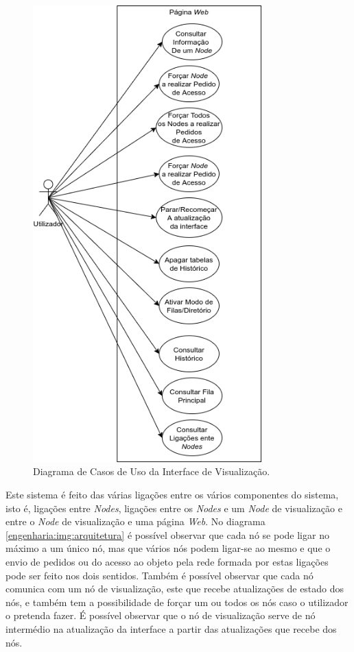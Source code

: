 \begin{figure}[h!]
\centering
\includegraphics[width=250pt]{use_case_diagram.png}
\caption{Diagrama de Casos de Uso da Interface de Visualização.}
\label{engenharia:img:casos_de_uso}
\end{figure}


Este sistema é feito das várias ligações entre os vários componentes do sistema, isto é,
ligações entre \emph{Nodes}, ligações entre os \emph{Nodes} e um \emph{Node} de visualização 
e entre o \emph{Node} de visualização e uma página \emph{Web}. No diagrama \ref{engenharia:img:arquitetura} é possível
observar que cada nó se pode ligar no máximo a um único nó, mas que vários nós podem ligar-se ao mesmo e que o envio de pedidos
ou do acesso ao objeto pela rede formada por estas ligações pode ser feito nos dois sentidos.
Também é possível observar que cada nó comunica com um nó de visualização, este que recebe atualizações de estado dos nós, 
e também tem a possibilidade de forçar um ou todos os nós caso o utilizador o pretenda fazer. 
É possível observar que o nó de visualização serve de nó intermédio na atualização da interface a partir das atualizações que recebe dos nós.




